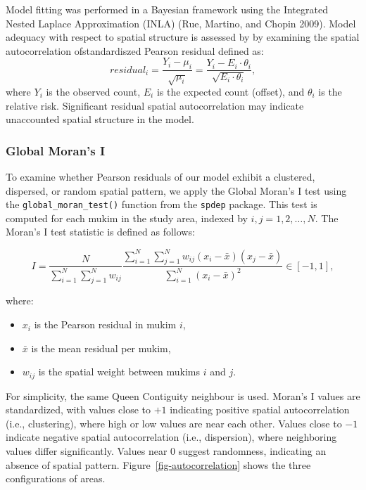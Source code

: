 \documentclass[
  12pt,
]{article}
\providecommand{\tightlist}{%
  \setlength{\itemsep}{0pt}\setlength{\parskip}{0pt}}
\begin{document}
Model fitting was performed in a Bayesian framework using the Integrated
Nested Laplace Approximation (INLA) (Rue, Martino, and Chopin 2009).
Model adequacy with respect to spatial structure is assessed by by
examining the spatial autocorrelation ofstandardiszed Pearson residual
defined as:
\[residual_i = \dfrac{Y_i - \mu_i}{\sqrt{\mu_i}} = \dfrac{Y_i - E_i \cdot \theta_i}{\sqrt{E_i \cdot \theta_i}},\]
where \(Y_i\) is the observed count, \(E_i\) is the expected count
(offset), and \(\theta_i\) is the relative risk. Significant residual
spatial autocorrelation may indicate unaccounted spatial structure in
the model.

\subsubsection{Global Moran's I}\label{global-morans-i}

To examine whether Pearson residuals of our model exhibit a clustered,
dispersed, or random spatial pattern, we apply the Global Moran's I test
using the \texttt{global\_moran\_test()} function from the
\texttt{spdep} package. This test is computed for each mukim in the
study area, indexed by \(i, j = 1, 2, \ldots, N\). The Moran's I test
statistic is defined as follows:

\[
I = \frac{N}{\sum_{i=1}^N \sum_{j=1}^N w_{ij}} \frac{\sum_{i=1}^N \sum_{j=1}^N w_{ij} (x_i - \bar{x})(x_j - \bar{x})}{\sum_{i=1}^N (x_i - \bar{x})^2} \in [-1,1],
\]

where:

\begin{itemize}
\tightlist
\item
  \(x_i\) is the Pearson residual in mukim \(i\),
\item
  \(\bar{x}\) is the mean residual per mukim,
\item
  \(w_{ij}\) is the spatial weight between mukims \(i\) and \(j\).
\end{itemize}

For simplicity, the same Queen Contiguity neighbour is used. Moran's I
values are standardized, with values close to \(+1\) indicating positive
spatial autocorrelation (i.e., clustering), where high or low values are
near each other. Values close to \(-1\) indicate negative spatial
autocorrelation (i.e., dispersion), where neighboring values differ
significantly. Values near \(0\) suggest randomness, indicating an
absence of spatial pattern. Figure~\ref{fig-autocorrelation} shows the
three configurations of areas.
\end{document}
